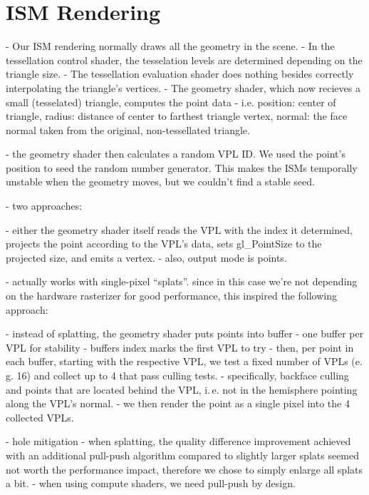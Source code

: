 \section{ISM Rendering}
\label{sec:impl:ismRendering}
- Our ISM rendering normally draws all the geometry in the scene.
- In the tessellation control shader, the tesselation levels are determined depending on the triangle size.
- The tessellation evaluation shader does nothing besides correctly interpolating the triangle's vertices.
- The geometry shader, which now recieves a small (tesselated) triangle, computes the point data
- i.e. position: center of triangle, radius: distance of center to farthest triangle vertex, normal: the face normal taken from the original, non-tessellated triangle.

- the geometry shader then calculates a random VPL ID. We used the point's position to seed the random number generator. This makes the ISMs temporally unstable when the geometry moves, but we couldn't find a stable seed.


- two approaches:

- either the geometry shader itself reads the VPL with the index it determined, projects the point according to the VPL's data, sets gl\_PointSize to the projected size, and emits a vertex.
- also, output mode is points.

- \citet{Marroquim:2007:reconstruction} actually works with single-pixel ``splats''. since in this case we're not depending on the hardware rasterizer for good performance, this inspired the following approach:

- instead of splatting, the geometry shader puts points into buffer
- one buffer per VPL for stability
- buffers index marks the first VPL to try
- then, per point in each buffer, starting with the respective VPL, we test a fixed number of VPLs (e.\,g. 16) and collect up to 4 that pass culling tests.
- specifically, backface culling and points that are located behind the VPL, i.\,e. not in the hemisphere pointing along the VPL's normal.
- we then render the point as a single pixel into the 4 collected VPLs.



- hole mitigation
- when splatting, the quality difference improvement achieved with an additional pull-push algorithm compared to slightly larger splats seemed not worth the performance impact, therefore we chose to simply enlarge all splats a bit.
- when using compute shaders, we need pull-push by design.

